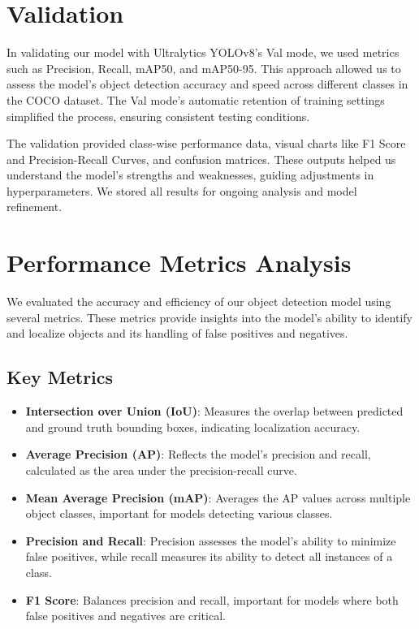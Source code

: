\documentclass[10pt]{extarticle}
\begin{document}
\section{Validation}

In validating our model with Ultralytics YOLOv8's Val mode, we used metrics such as Precision, Recall, mAP50, and mAP50-95. This approach allowed us to assess the model's object detection accuracy and speed across different classes in the COCO dataset. The Val mode's automatic retention of training settings simplified the process, ensuring consistent testing conditions.

The validation provided class-wise performance data, visual charts like F1 Score and Precision-Recall Curves, and confusion matrices. These outputs helped us understand the model's strengths and weaknesses, guiding adjustments in hyperparameters. We stored all results for ongoing analysis and model refinement.
\section{Performance Metrics Analysis}

We evaluated the accuracy and efficiency of our object detection model using several metrics. These metrics provide insights into the model's ability to identify and localize objects and its handling of false positives and negatives.

\subsection{Key Metrics}

\begin{itemize}
    \item \textbf{Intersection over Union (IoU)}: Measures the overlap between predicted and ground truth bounding boxes, indicating localization accuracy.
    \item \textbf{Average Precision (AP)}: Reflects the model's precision and recall, calculated as the area under the precision-recall curve.
    \item \textbf{Mean Average Precision (mAP)}: Averages the AP values across multiple object classes, important for models detecting various classes.
    \item \textbf{Precision and Recall}: Precision assesses the model's ability to minimize false positives, while recall measures its ability to detect all instances of a class.
    \item \textbf{F1 Score}: Balances precision and recall, important for models where both false positives and negatives are critical.
\end{itemize}
\end{document}
